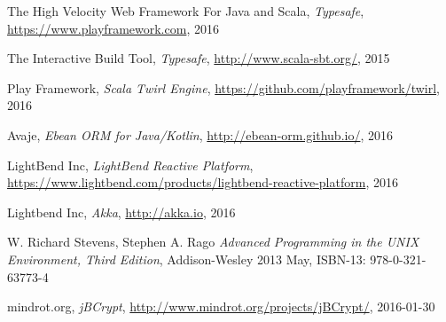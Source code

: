 \documentclass[12pt,twoside,a4paper]{report}
\begin{document}
\begin{thebibliography}{99}
The High Velocity Web Framework For Java and Scala,
\emph{Typesafe},
\url{https://www.playframework.com},
2016

The Interactive Build Tool,
\emph{Typesafe},
\url{http://www.scala-sbt.org/},
2015

Play Framework,
\emph{Scala Twirl Engine},
\url{https://github.com/playframework/twirl},
2016

Avaje,
\emph{Ebean ORM for Java/Kotlin},
\url{http://ebean-orm.github.io/},
2016

LightBend Inc,
\emph{LightBend Reactive Platform},
\url{https://www.lightbend.com/products/lightbend-reactive-platform},
2016

Lightbend Inc,
\emph{Akka},
\url{http://akka.io},
2016

W. Richard Stevens, Stephen A. Rago
\emph{Advanced Programming in the UNIX Environment, Third Edition},
Addison-Wesley
2013 May, ISBN-13: 978-0-321-63773-4

mindrot.org,
\emph{jBCrypt},
\url{http://www.mindrot.org/projects/jBCrypt/},
2016-01-30

\end{thebibliography}
\end{document}

